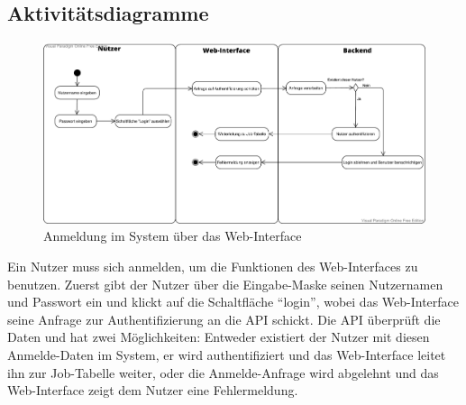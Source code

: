 \pagebreak

\subsection{Aktivitätsdiagramme}
\begin{figure}[H]
    \centering
    \includegraphics[width=\textwidth]{images-interface/v3_aktivitaetsdiagramme/Anmelden_v10.pdf}
    \caption{Anmeldung im System über das \gls{Web-Interface}}
    \label{fig:login_activity}
    
\end{figure}
Ein \gls{Nutzer} muss sich anmelden, um die Funktionen des \gls{Web-Interface}s zu benutzen. Zuerst gibt der \gls{Nutzer} über die Eingabe-Maske seinen Nutzernamen und Passwort ein und klickt auf die Schaltfläche \enquote{login}, wobei das \gls{Web-Interface} seine Anfrage zur Authentifizierung an die \gls{API} schickt. Die \gls{API} überprüft die Daten und hat zwei Möglichkeiten: Entweder existiert der \gls{Nutzer} mit diesen Anmelde-Daten im System, er wird authentifiziert und das \gls{Web-Interface} leitet ihn zur Job-Tabelle weiter, oder die Anmelde-Anfrage wird abgelehnt und das \gls{Web-Interface} zeigt dem \gls{Nutzer} eine Fehlermeldung.


